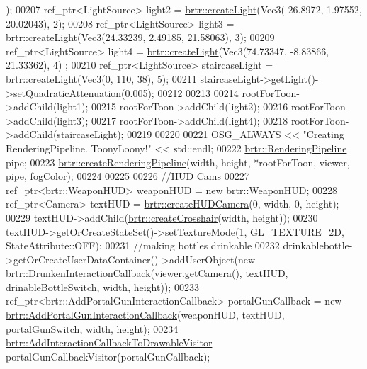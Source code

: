 \begin{DoxyCode}
      );
00207     ref\_ptr<LightSource> light2 = \hyperlink{namespacebrtr_ad772c6dbc0a2cabd40a284676c124a97}{brtr::createLight}(Vec3(-26.8972, 1.97552, 20.02043), 2);
00208     ref\_ptr<LightSource> light3 = \hyperlink{namespacebrtr_ad772c6dbc0a2cabd40a284676c124a97}{brtr::createLight}(Vec3(24.33239, 2.49185, 21.58063), 3);
00209     ref\_ptr<LightSource> light4 = \hyperlink{namespacebrtr_ad772c6dbc0a2cabd40a284676c124a97}{brtr::createLight}(Vec3(74.73347, -8.83866, 21.33362), 4)
      ;
00210     ref\_ptr<LightSource> staircaseLight = \hyperlink{namespacebrtr_ad772c6dbc0a2cabd40a284676c124a97}{brtr::createLight}(Vec3(0, 110, 38), 5);
00211     staircaseLight->getLight()->setQuadraticAttenuation(0.005);
00212 
00213 
00214     rootForToon->addChild(light1);
00215     rootForToon->addChild(light2);
00216     rootForToon->addChild(light3);
00217     rootForToon->addChild(light4); 
00218     rootForToon->addChild(staircaseLight);
00219 
00220 
00221     OSG\_ALWAYS << \textcolor{stringliteral}{"Creating RenderingPipeline. ToonyLoony!"} << std::endl;
00222     \hyperlink{structbrtr_1_1_rendering_pipeline}{brtr::RenderingPipeline} pipe;
00223     \hyperlink{namespacebrtr_adcf0546a392221be3958ec96f99887f0}{brtr::createRenderingPipeline}(width, height, *rootForToon, viewer, pipe,
      fogColor);
00224 
00225 
00226     \textcolor{comment}{//HUD Cams}
00227     ref\_ptr<brtr::WeaponHUD> weaponHUD = \textcolor{keyword}{new} \hyperlink{classbrtr_1_1_weapon_h_u_d}{brtr::WeaponHUD};
00228     ref\_ptr<Camera> textHUD = \hyperlink{namespacebrtr_a62da4f109238c45882dd64d7a7e97a1d}{brtr::createHUDCamera}(0, width, 0, height);
00229     textHUD->addChild(\hyperlink{namespacebrtr_a31c533ae635c528c761cc83e34e91b2f}{brtr::createCrosshair}(width, height));
00230     textHUD->getOrCreateStateSet()->setTextureMode(1, GL\_TEXTURE\_2D, StateAttribute::OFF);
00231     \textcolor{comment}{//making bottles drinkable}
00232     drinkablebottle->getOrCreateUserDataContainer()->addUserObject(\textcolor{keyword}{new} 
      \hyperlink{classbrtr_1_1_drunken_interaction_callback}{brtr::DrunkenInteractionCallback}(viewer.getCamera(), textHUD, 
      drinableBottleSwitch, width, height));
00233     ref\_ptr<brtr::AddPortalGunInteractionCallback> portalGunCallback = \textcolor{keyword}{new} 
      \hyperlink{classbrtr_1_1_add_portal_gun_interaction_callback}{brtr::AddPortalGunInteractionCallback}(weaponHUD, textHUD, 
      portalGunSwitch, width, height);
00234     \hyperlink{classbrtr_1_1_add_interaction_callback_to_drawable_visitor}{brtr::AddInteractionCallbackToDrawableVisitor} 
      portalGunCallbackVisitor(portalGunCallback);

\end{DoxyCode}
